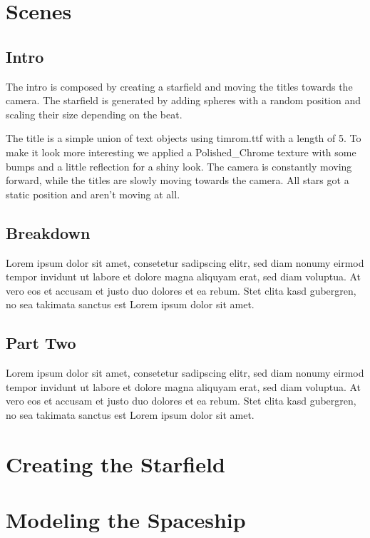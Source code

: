\documentclass[a4paper, 12pt]{scrartcl}
\begin{document}
    \section{Scenes}
    \subsection{Intro}

    The intro is composed by creating a starfield and moving the titles towards the camera.
    The starfield is generated by adding spheres with a random position and scaling their size
    depending on the beat.

    The title is a simple union of text objects using timrom.ttf with a length of 5. To make
    it look more interesting we applied a Polished\_Chrome texture with some bumps and a little
    reflection for a shiny look. The camera is constantly moving forward, while the titles are
    slowly moving towards the camera. All stars got a static position and aren't moving at all.

    \subsection{Breakdown}

    Lorem ipsum dolor sit amet, consetetur sadipscing elitr, sed diam nonumy eirmod
    tempor invidunt ut labore et dolore magna aliquyam erat, sed diam voluptua. At
    vero eos et accusam et justo duo dolores et ea rebum. Stet clita kasd gubergren,
    no sea takimata sanctus est Lorem ipsum dolor sit amet.

    \subsection{Part Two}

    Lorem ipsum dolor sit amet, consetetur sadipscing elitr, sed diam nonumy eirmod
    tempor invidunt ut labore et dolore magna aliquyam erat, sed diam voluptua. At
    vero eos et accusam et justo duo dolores et ea rebum. Stet clita kasd gubergren,
    no sea takimata sanctus est Lorem ipsum dolor sit amet.

    \section{Creating the Starfield}

    \section{Modeling the Spaceship}
\end{document}
